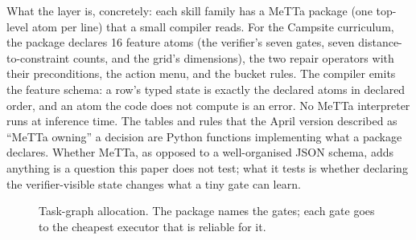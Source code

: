 \documentclass[11pt]{article}
\begin{document}
What the layer is, concretely: each skill family has a MeTTa package (one top-level atom per line) that a small compiler reads. For the Campsite curriculum, the package declares 16 feature atoms (the verifier's seven gates, seven distance-to-constraint counts, and the grid's dimensions), the two repair operators with their preconditions, the action menu, and the bucket rules. The compiler emits the feature schema: a row's typed state is exactly the declared atoms in declared order, and an atom the code does not compute is an error. No MeTTa interpreter runs at inference time. The tables and rules that the April version described as ``MeTTa owning'' a decision are Python functions implementing what a package declares. Whether MeTTa, as opposed to a well-organised JSON schema, adds anything is a question this paper does not test; what it tests is whether declaring the verifier-visible state changes what a tiny gate can learn.

\begin{figure}[t]
  \centering
  \caption{Task-graph allocation. The package names the gates; each gate goes to the cheapest executor that is reliable for it.}
  \label{fig:schema}
\end{figure}
\end{document}
